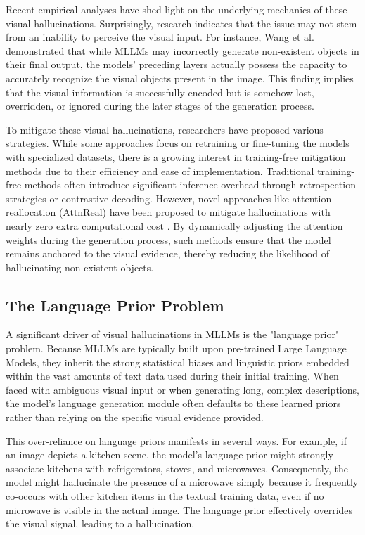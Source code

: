 \documentclass[11pt,a4paper]{article}
\begin{document}
Recent empirical analyses have shed light on the underlying mechanics of these visual hallucinations. Surprisingly, research indicates that the issue may not stem from an inability to perceive the visual input. For instance, Wang et al.  demonstrated that while MLLMs may incorrectly generate non-existent objects in their final output, the models' preceding layers actually possess the capacity to accurately recognize the visual objects present in the image. This finding implies that the visual information is successfully encoded but is somehow lost, overridden, or ignored during the later stages of the generation process.

To mitigate these visual hallucinations, researchers have proposed various strategies. While some approaches focus on retraining or fine-tuning the models with specialized datasets, there is a growing interest in training-free mitigation methods due to their efficiency and ease of implementation. Traditional training-free methods often introduce significant inference overhead through retrospection strategies or contrastive decoding. However, novel approaches like attention reallocation (AttnReal) have been proposed to mitigate hallucinations with nearly zero extra computational cost . By dynamically adjusting the attention weights during the generation process, such methods ensure that the model remains anchored to the visual evidence, thereby reducing the likelihood of hallucinating non-existent objects.

\subsection{The Language Prior Problem}

A significant driver of visual hallucinations in MLLMs is the "language prior" problem. Because MLLMs are typically built upon pre-trained Large Language Models, they inherit the strong statistical biases and linguistic priors embedded within the vast amounts of text data used during their initial training. When faced with ambiguous visual input or when generating long, complex descriptions, the model's language generation module often defaults to these learned priors rather than relying on the specific visual evidence provided.

This over-reliance on language priors manifests in several ways. For example, if an image depicts a kitchen scene, the model's language prior might strongly associate kitchens with refrigerators, stoves, and microwaves. Consequently, the model might hallucinate the presence of a microwave simply because it frequently co-occurs with other kitchen items in the textual training data, even if no microwave is visible in the actual image. The language prior effectively overrides the visual signal, leading to a hallucination.
\end{document}
